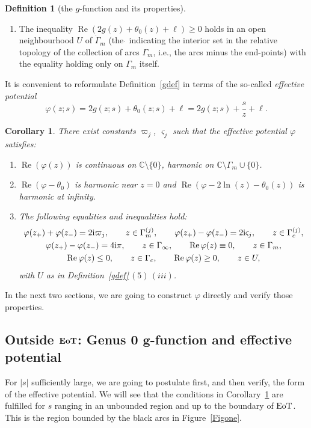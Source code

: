 \documentclass[10pt,a4paper]{amsart}
\numberwithin{equation}{section}
\newtheorem{Corollary}[Theorem]{Corollary}
\theoremstyle{definition}
\newtheorem{Definition}[Theorem]{Definition}
\def\le{\left}
\def\ri{\right}
\def\be{\begin{equation}}
\def\ee{\end{equation}}
\def\C{{\mathbb C}}
\def \Re{\operatorname{Re} }
\begin{document}
\begin{Definition}[the $g$-function and its properties]
\begin{enumerate}
\begin{enumerate}
\item [(iii)]
The inequality
$
\Re\le(2g(z)+ \theta_0(z) + \ell \ri) \geq 0
$
holds
in an open neighbourhood $U$ of $\dot \Gamma_m$ (the $\dot{}$ indicating the interior set in the relative topology of the collection of arcs $\Gamma_m$, i.e., the arcs minus the end-points) with the equality holding only on $\Gamma_m$ itself.
\end{enumerate}
\end{enumerate}
\end{Definition}

 It is convenient to reformulate Definition~\ref{gdef} in terms of the so-called {\it effective potential}
 \be
\label{defphi}
\varphi(z;s) = 2g(z;s) + \theta_0(z;s) + \ell = 2g(z;s) + \frac s z +\ell.
\ee
\begin{Corollary}
\label{corphicond}
There exist constants $\varpi_j$, $\varsigma_j$ such that the effective potential $\varphi$ satisfies:
\begin{enumerate}\itemsep=0pt
\item[$(1)$]
$\Re(\varphi(z))$ is continuous on $\C\setminus \{0\}$, harmonic on $\C\setminus \Gamma_m\cup \{0\}$.
\item[$(2)$] $\Re(\varphi- \theta_0)$ is harmonic near $z=0$ and $\Re(\varphi -2\ln(z) - \theta_0(z))$ is harmonic at infinity.
\item[$(3)$] The following equalities and inequalities hold:
\begin{gather*}%
\varphi(z_+) + \varphi(z_-) = 2{\rm i}{\varpi}_j,\qquad z\in \Gamma_{m}^{(j)},\qquad
\varphi(z_+)-\varphi(z_-) =2 {\rm i}{\varsigma}_j, \qquad z\in \Gamma_{c}^{(j)},\\
\varphi(z_+)-\varphi(z_-) = 4{\rm i}\pi,\qquad z\in \Gamma_\infty,\qquad
\Re\varphi(z)\equiv 0, \qquad z\in \Gamma_m,\\
\Re\varphi(z)\leq 0,\qquad z\in \Gamma_c,\qquad
\Re \varphi(z)\geq 0,\qquad z\in U,
\end{gather*}
with $U$ as in Definition~{\rm\ref{gdef}}\,$(5)\,(iii)$.
\end{enumerate}
\end{Corollary}
In the next two sections, we are going to construct $\varphi$ directly and verify those properties.

 \subsection[Outside EoT: Genus 0 $g$-function and effective potential]{Outside $\boldsymbol{{\rm EoT}}$: Genus $\boldsymbol{0}$ $\boldsymbol{g}$-function and effective potential}
 \label{gzero}
 For $|s|$ sufficiently large, we are going to postulate first, and then verify, the form of the effective potential. We will see that the conditions in Corollary~\ref{corphicond} are fulfilled for $s$ ranging in an unbounded region and up to the boundary of ${\rm EoT}$. This is the region bounded by the black arcs in Figure~\ref{Figone}.
\end{document}
